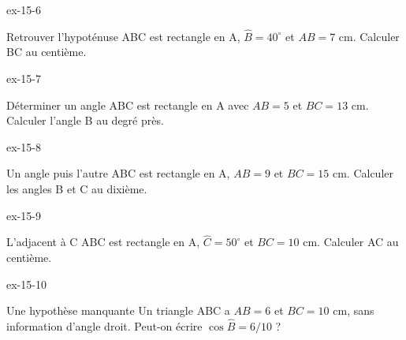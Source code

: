 \begin{blocLivre}{ex-15-6}\begin{exercice}[2]{Retrouver l’hypoténuse}
ABC est rectangle en A, $\widehat B=40^\circ$ et $AB=7$ cm. Calculer BC au centième.
\label{fig-ex-15-6}
\end{exercice}\end{blocLivre}
\begin{blocLivre}{ex-15-7}\begin{exercice}[2]{Déterminer un angle}
ABC est rectangle en A avec $AB=5$ et $BC=13$ cm. Calculer l’angle B au degré près.
\label{fig-ex-15-7}
\end{exercice}\end{blocLivre}
\begin{blocLivre}{ex-15-8}\begin{exercice}[2]{Un angle puis l’autre}
ABC est rectangle en A, $AB=9$ et $BC=15$ cm. Calculer les angles B et C au dixième.
\label{fig-ex-15-8}
\end{exercice}\end{blocLivre}
\begin{blocLivre}{ex-15-9}\begin{exercice}[2]{L’adjacent à C}
ABC est rectangle en A, $\widehat C=50^\circ$ et $BC=10$ cm. Calculer AC au centième.
\label{fig-ex-15-9}
\end{exercice}\end{blocLivre}
\begin{blocLivre}{ex-15-10}\begin{exercice}[2]{Une hypothèse manquante}
Un triangle ABC a $AB=6$ et $BC=10$ cm, sans information d’angle droit. Peut-on écrire $\cos\widehat B=6/10$ ?
\label{fig-ex-15-10}
\end{exercice}\end{blocLivre}

